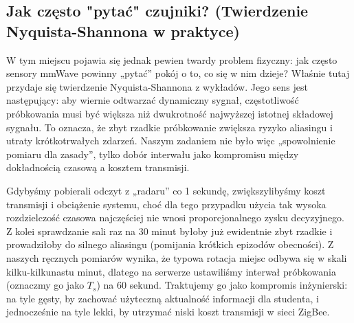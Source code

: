 \documentclass[14pt,a4paper]{extarticle}
\begin{document}
\subsection{Jak często "pytać" czujniki? (Twierdzenie Nyquista-Shannona w praktyce)}
W tym miejscu pojawia się jednak pewien twardy problem fizyczny: jak często sensory mmWave powinny „pytać” pokój o to, co się w nim dzieje? Właśnie tutaj przydaje się twierdzenie Nyquista-Shannona z wykładów. Jego sens jest następujący: aby wiernie odtwarzać dynamiczny sygnał, częstotliwość próbkowania musi być większa niż dwukrotność najwyższej istotnej składowej sygnału. To oznacza, że zbyt rzadkie próbkowanie zwiększa ryzyko aliasingu i utraty krótkotrwałych zdarzeń. Naszym zadaniem nie było więc „spowolnienie pomiaru dla zasady”, tylko dobór interwału jako kompromisu między dokładnością czasową a kosztem transmisji.

Gdybyśmy pobierali odczyt z „radaru” co 1 sekundę, zwiększylibyśmy koszt transmisji i obciążenie systemu, choć dla tego przypadku użycia tak wysoka rozdzielczość czasowa najczęściej nie wnosi proporcjonalnego zysku decyzyjnego. Z kolei sprawdzanie sali raz na 30 minut byłoby już ewidentnie zbyt rzadkie i prowadziłoby do silnego aliasingu (pomijania krótkich epizodów obecności). Z naszych ręcznych pomiarów wynika, że typowa rotacja miejsc odbywa się w skali kilku-kilkunastu minut, dlatego na serwerze ustawiliśmy interwał próbkowania (oznaczmy go jako $T_s$) na 60 sekund. Traktujemy go jako kompromis inżynierski: na tyle gęsty, by zachować użyteczną aktualność informacji dla studenta, i jednocześnie na tyle lekki, by utrzymać niski koszt transmisji w sieci ZigBee.
\end{document}
